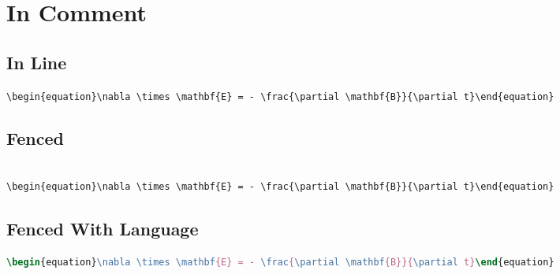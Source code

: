 \chapter{In Comment}
\label{incomment}

\section{In Line}
\label{inline}

\texttt{\textbackslash{}begin\{equation\}\textbackslash{}nabla \textbackslash{}times \textbackslash{}mathbf\{E\} = - \textbackslash{}frac\{\textbackslash{}partial \textbackslash{}mathbf\{B\}\}\{\textbackslash{}partial t\}\textbackslash{}end\{equation\}}

\section{Fenced}
\label{fenced}

\begin{adjustwidth}{2.5em}{2.5em}
\begin{verbatim}

\begin{equation}\nabla \times \mathbf{E} = - \frac{\partial \mathbf{B}}{\partial t}\end{equation}

\end{verbatim}
\end{adjustwidth}

\section{Fenced With Language}
\label{fencedwithlanguage}

\begin{adjustwidth}{2.5em}{2.5em}
\begin{lstlisting}[language=latex]
\begin{equation}\nabla \times \mathbf{E} = - \frac{\partial \mathbf{B}}{\partial t}\end{equation}

\end{lstlisting}
\end{adjustwidth}




